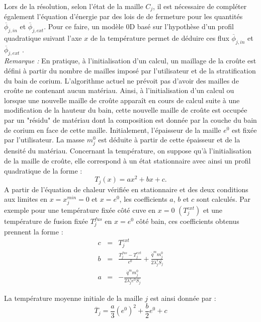 Lors de la résolution, selon l'état de la maille $C_j$, il est nécessaire de compléter également l'équation d'énergie par des lois de de fermeture pour les quantités $\overline{\phi}_{j,in}$ et $\overline{\phi}_{j,ext}$. Pour ce faire, un modèle 0D basé sur l'hypothèse d'un profil quadratique suivant l'axe $x$ de la température permet de déduire ces flux $\overline{\phi}_{j,in}$ et $\overline{\phi}_{j,ext}$ \cite{LeTellier2016}.\\

{\it Remarque :}
En pratique, à l'initialisation d'un calcul, un maillage de la croûte est défini à partir du nombre de mailles imposé par l'utilisateur et de la stratification du bain de corium. L'algorithme actuel ne prévoit pas d'avoir des mailles de croûte ne contenant aucun matériau. Ainsi, à l'initialisation d'un calcul ou lorsque une nouvelle maille de croûte apparaît en cours de calcul suite à une modification de la hauteur du bain, cette nouvelle maille de croûte est occupée par un "résidu" de matériau dont la composition est donnée par la couche du bain de corium en face de cette maille. Initialement, l'épaisseur de la maille $e^0$ est fixée par l'utilisateur. La masse $m_j^0$ est déduite à partir de cette épaisseur et de la densité du matériau. Concernant la température, on suppose qu'à l'initialisation de la maille de croûte, elle correspond à un état stationnaire avec ainsi un profil quadratique de la forme : 
$$T_j(x)=ax^2+bx+c.$$
A partir de l'équation de chaleur vérifiée en stationnaire et des deux conditions aux limites en $x=x_j^{min}=0$ et $x=e^0$, les coefficients $a$, $b$ et $c$ sont calculés. Par exemple pour une température fixée côté cuve en $x=0$ $(T_j^{ext})$ et une température de fusion fixée $T_j^{fus}$ en $x=e^0$ côté bain, ces coefficients obtenus prennent la forme :
\begin{eqnarray*}
c &=& T^{ext}_j \\
b &=& \frac{T_j^{fus}-T^{ext}_j}{e^0}+\frac{\dot{q}^m m_j^0}{2\lambda_j^s S_j} \\
a &=& -\frac{\dot{q}^m m_j^0}{2\lambda_j^s e^0 S_j}
\end{eqnarray*}

La température moyenne initiale de la maille $j$ est ainsi donnée par :
$$\overline{T}_{j}=\frac{a}{3} ({e^0})^2 + \frac{b}{2} e^0 + c$$
